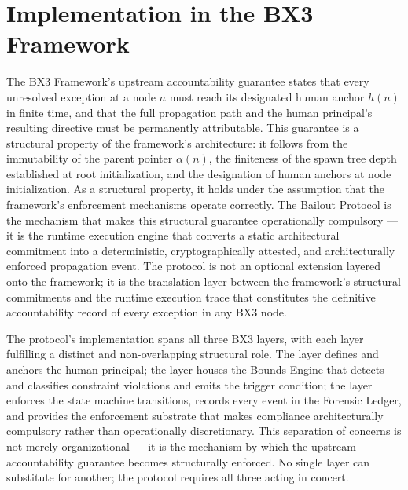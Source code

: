 \section{Implementation in the BX3 Framework}
\label{sec:bailout-implementation}

The BX3 Framework's upstream accountability guarantee states that every
unresolved exception at a node $n$ must reach its designated human anchor
$h(n)$ in finite time, and that the full propagation path and the human
principal's resulting directive must be permanently attributable.  This
guarantee is a structural property of the framework's architecture: it follows
from the immutability of the parent pointer $\alpha(n)$, the finiteness of the
spawn tree depth established at root initialization, and the designation of
human anchors at node initialization.  As a structural property, it holds under
the assumption that the framework's enforcement mechanisms operate correctly.
The Bailout Protocol is the mechanism that makes this structural guarantee
operationally compulsory --- it is the runtime execution engine that converts
a static architectural commitment into a deterministic,
cryptographically attested, and architecturally enforced propagation event.
The protocol is not an optional extension layered onto the framework; it is
the translation layer between the framework's structural commitments and the
runtime execution trace that constitutes the definitive accountability record
of every exception in any BX3 node.

The protocol's implementation spans all three BX3 layers, with each layer
fulfilling a distinct and non-overlapping structural role.  The \purpose{}
layer defines and anchors the human principal; the \bounds{} layer houses
the Bounds Engine that detects and classifies constraint violations and emits
the trigger condition; the \fact{} layer enforces the state machine
transitions, records every event in the Forensic Ledger, and provides the
enforcement substrate that makes compliance architecturally compulsory rather
than operationally discretionary.  This separation of concerns is not merely
organizational --- it is the mechanism by which the upstream accountability
guarantee becomes structurally enforced.  No single layer can substitute for
another; the protocol requires all three acting in concert.

